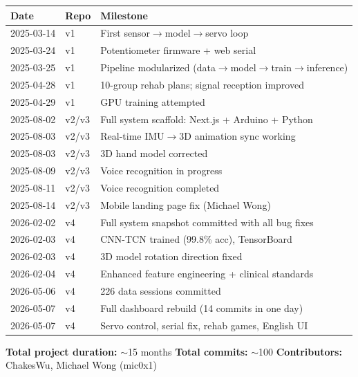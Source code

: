 \documentclass[12pt,a4paper]{article}
\begin{document}
\begin{center}
\begin{tabular}{@{}p{2.5cm} p{1.8cm} p{9.5cm}@{}}
\toprule
\textbf{Date} & \textbf{Repo} & \textbf{Milestone} \\
\midrule
2025-03-14 & v1      & First sensor$\rightarrow$model$\rightarrow$servo loop \\
2025-03-24 & v1      & Potentiometer firmware + web serial \\
2025-03-25 & v1      & Pipeline modularized (data$\rightarrow$model$\rightarrow$train$\rightarrow$inference) \\
2025-04-28 & v1      & 10-group rehab plans; signal reception improved \\
2025-04-29 & v1      & GPU training attempted \\
2025-08-02 & v2/v3   & Full system scaffold: Next.js + Arduino + Python \\
2025-08-03 & v2/v3   & Real-time IMU$\rightarrow$3D animation sync working \\
2025-08-03 & v2/v3   & 3D hand model corrected \\
2025-08-09 & v2/v3   & Voice recognition in progress \\
2025-08-11 & v2/v3   & Voice recognition completed \\
2025-08-14 & v2/v3   & Mobile landing page fix (Michael Wong) \\
2026-02-02 & v4      & Full system snapshot committed with all bug fixes \\
2026-02-03 & v4      & CNN-TCN trained (99.8\% acc), TensorBoard \\
2026-02-03 & v4      & 3D model rotation direction fixed \\
2026-02-04 & v4      & Enhanced feature engineering + clinical standards \\
2026-05-06 & v4      & 226 data sessions committed \\
2026-05-07 & v4      & Full dashboard rebuild (14 commits in one day) \\
2026-05-07 & v4      & Servo control, serial fix, rehab games, English UI \\
\bottomrule
\end{tabular}
\end{center}

\noindent\textbf{Total project duration:} $\sim$15 months \quad \textbf{Total commits:} $\sim$100 \quad \textbf{Contributors:} ChakesWu, Michael Wong (mic0x1)

\appendix
\end{document}
